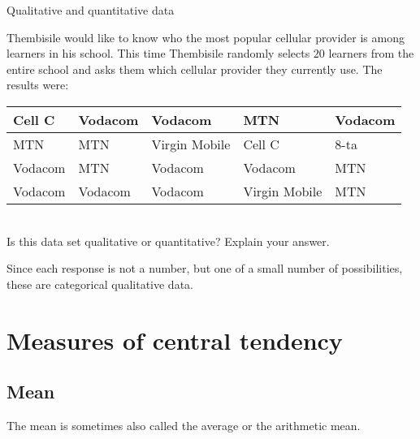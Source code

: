 \begin{wex}{Qualitative and quantitative data}{
    Thembisile would like to know who the most popular cellular
    provider is among learners in his school. This time Thembisile
    randomly selects $20$ learners from the entire school and asks them
    which cellular provider they currently use. The results were:

    \begin{center}
      \begin{tabular}{|p{}|p{}|p{}|p{}|p{}|}\hline
        
        Cell C & Vodacom & Vodacom & MTN & Vodacom \\\hline
        MTN & MTN & Virgin Mobile & Cell C & 8-ta \\\hline
        Vodacom & MTN & Vodacom & Vodacom & MTN \\\hline
        Vodacom & Vodacom & Vodacom & Virgin Mobile & MTN \\\hline
      \end{tabular}
    \end{center}
\vspace{8pt}\\
    Is this data set qualitative or quantitative? Explain your answer.
}{
  Since each response is not a number, but one of a small number of
  possibilities, these are categorical qualitative data.

}
\end{wex}

\section{Measures of central tendency}

\subsection{Mean}
The mean is sometimes also called the average or the arithmetic mean.

